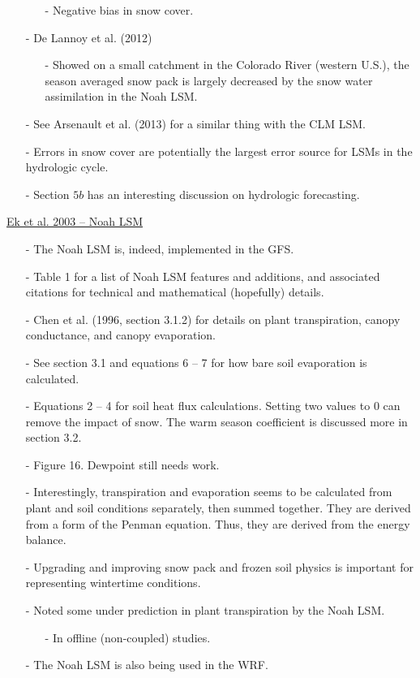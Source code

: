 \documentclass[12pt, letterpaper]{article}
\begin{document}
\begin{itemize}
\begin{itemize}
        	\item[-] Negative bias in snow cover.
        \end{itemize}
        \item[-] De Lannoy et al. (2012)
        \begin{itemize}
        	\item[-] Showed on a small catchment in the Colorado River (western U.S.), the season
        	         averaged snow pack is largely decreased by the snow water assimilation in the Noah
        	         LSM.
        \end{itemize}
        \item[-] See Arsenault et al. (2013) for a similar thing with the CLM LSM.
        \item[-] Errors in snow cover are potentially the largest error source for LSMs in the hydrologic
                 cycle.
        \item[-] Section $5b$ has an interesting discussion on hydrologic forecasting.
    \end{itemize}

    \underline{Ek et al. 2003 -- Noah LSM}
    \begin{itemize}
    	\item[-] The Noah LSM is, indeed, implemented in the GFS.
    	\item[-] Table 1 for a list of Noah LSM features and additions, and associated citations for
    	         technical and mathematical (hopefully) details.
    	\item[-] Chen et al. (1996, section 3.1.2) for details on plant transpiration, canopy conductance,
    	         and canopy evaporation.
    	\item[-] See section 3.1 and equations 6 -- 7 for how bare soil evaporation is calculated.
    	\item[-] Equations 2 -- 4 for soil heat flux calculations. Setting two values to 0 can remove
    	         the impact of snow. The warm season coefficient is discussed more in section 3.2.
    	\item[-] Figure 16. Dewpoint still needs work.
    	\item[-] Interestingly, transpiration and evaporation seems to be calculated from plant and
    	         soil conditions separately, then summed together. They are derived from a form of the
    	         Penman equation. Thus, they are derived from the energy balance.
    	\item[-] Upgrading and improving snow pack and frozen soil physics is important for representing
    	         wintertime conditions.
    	\item[-] Noted some under prediction in plant transpiration by the Noah LSM.
    	\begin{itemize}
    		\item[-] In offline (non-coupled) studies.
    	\end{itemize}
        \item[-] The Noah LSM is also being used in the WRF.
    \end{itemize}
\end{document}
